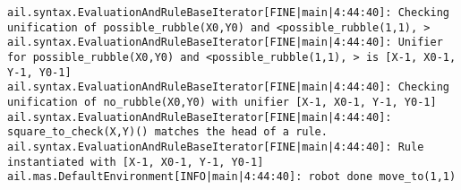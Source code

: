 \documentclass[a4]{article}
\begin{document}
\begin{verbatim}
ail.syntax.EvaluationAndRuleBaseIterator[FINE|main|4:44:40]: Checking unification of possible_rubble(X0,Y0) and <possible_rubble(1,1), > 
ail.syntax.EvaluationAndRuleBaseIterator[FINE|main|4:44:40]: Unifier for possible_rubble(X0,Y0) and <possible_rubble(1,1), > is [X-1, X0-1, Y-1, Y0-1] 
ail.syntax.EvaluationAndRuleBaseIterator[FINE|main|4:44:40]: Checking unification of no_rubble(X0,Y0) with unifier [X-1, X0-1, Y-1, Y0-1] 
ail.syntax.EvaluationAndRuleBaseIterator[FINE|main|4:44:40]: square_to_check(X,Y)() matches the head of a rule. 
ail.syntax.EvaluationAndRuleBaseIterator[FINE|main|4:44:40]: Rule instantiated with [X-1, X0-1, Y-1, Y0-1] 
ail.mas.DefaultEnvironment[INFO|main|4:44:40]: robot done move_to(1,1) 
\end{verbatim}
\end{document}
